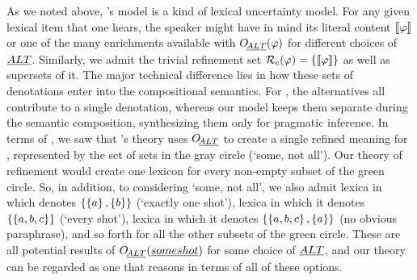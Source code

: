\documentclass[leqno,12pt]{article}
\begin{document}
As we noted above, \CFS's model is a kind of lexical uncertainty
model. For any given lexical item that one hears, the speaker might
have in mind its literal content $\llbracket\varphi\rrbracket$ or one of the many
enrichments available with $\mathop{O\negthinspace_{\emph{ALT}}}(\varphi)$ for different choices of
$\emph{ALT}$. Similarly, we admit the trivial refinement set
$\mathcal{R}_{c}(\varphi) = \left\{ \llbracket\varphi\rrbracket \right\}$ as well as supersets of
it. The major technical difference lies in how these sets of
denotations enter into the compositional semantics. For \CFS, the
alternatives all contribute to a single denotation, whereas our model
keeps them separate during the semantic composition, synthesizing them
only for pragmatic inference. In terms of , we saw
that \CFS's theory uses $\mathop{O\negthinspace_{\emph{ALT}}}$ to create a single refined meaning for
, represented by the set of sets in the gray circle
(`some, not all'). Our theory of refinement would create one lexicon
for every non-empty subset of the green circle. So, in addition, to
considering `some, not all', we also admit lexica in which  denotes $\left\{ \left\{ a \right\}, \left\{ b \right\} \right\}$ (`exactly one shot'),
lexica in which it denotes $\left\{ \left\{ a,b,c \right\} \right\}$ (`every shot'), lexica
in which it denotes $\left\{ \left\{ a,b,c \right\},\left\{ a \right\} \right\}$ (no obvious
paraphrase), and so forth for all the other subsets of the green
circle. These are all potential results of $\mathop{O\negthinspace_{\emph{ALT}}}(\emph{some shot})$
for some choice of $\emph{ALT}$, and our theory can be regarded as one that
reasons in terms of all of these options.
\end{document}
